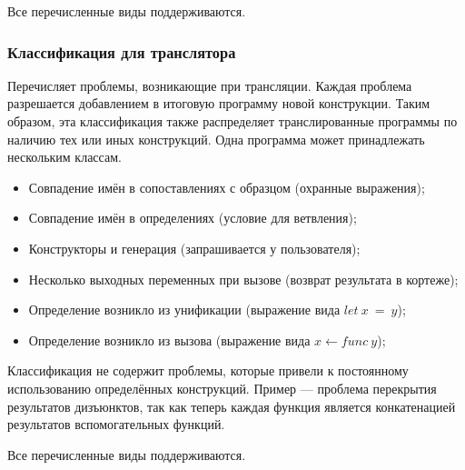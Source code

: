 Все перечисленные виды поддерживаются.


\subsubsection{Классификация для транслятора}

Перечисляет проблемы, возникающие при трансляции.
Каждая проблема разрешается добавлением в итоговую программу новой конструкции.
Таким образом, эта классификация также распределяет транслированные программы по наличию тех или иных конструкций.
Одна программа может принадлежать нескольким классам.

\begin{itemize}
    \item Совпадение имён в сопоставлениях с образцом (охранные выражения);
    \item Совпадение имён в определениях (условие для ветвления);
    \item Конструкторы и генерация (запрашивается у пользователя);
    \item Несколько выходных переменных при вызове (возврат результата в кортеже);
    \item Определение возникло из унификации (выражение вида $let~x~=~y$);
    \item Определение возникло из вызова (выражение вида $x \leftarrow func~y$);
\end{itemize}

Классификация не содержит проблемы, которые привели к постоянному использованию определённых конструкций.
Пример --- проблема перекрытия результатов дизъюнктов, так как теперь каждая функция является конкатенацией результатов вспомогательных функций.

Все перечисленные виды поддерживаются.
